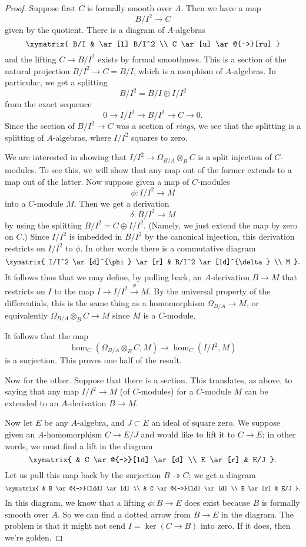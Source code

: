 \begin{proof} 
Suppose first $C$ is formally smooth over $A$.
Then we have a map
\[ B/I^2 \to C  \]
given by the quotient. 
There is a diagram of $A$-algebras
\[ \xymatrix{
B/I & \ar[l] B/I^2 \\
C \ar[u] \ar@{-->}[ru]
}\]
and the lifting $C \to B/I^2$ exists by formal smoothness. 
This is a section of the natural projection $B/I^2 \to C = B/I$, which is a
morphism of $A$-algebras.
In particular, we get a splitting 
\[ B/I^2 = B/I \oplus I/I^2  \]
from the exact sequence
\[ 0 \to I/I^2 \to B/I^2 \to C \to 0.  \]
Since the section of $B/I^2 \to C$ was a section of \emph{rings}, we see that
the splitting is a splitting of $A$-algebras, where $I/I^2$ squares to zero.

We are interested in showing that $I/I^2 \to \Omega_{B/A} \otimes_B C$ is a
split injection of $C$-modules. To see this, we will show that any map out of the former
extends to a map out of the latter.
Now suppose given a map
of $C$-modules
\[ \phi:  I/I^2 \to M \]
into a $C$-module $M$.
Then we get a derivation
\[ \delta:  B/I^2 \to M  \]
by using the splitting $B/I^2 = C \oplus I/I^2$.
(Namely, we just extend the map by zero on $C$.)
Since $I/I^2$ is imbedded in $B/I^2$ by the canonical injection, this
derivation restricts on $I/I^2$ to $\phi$. In other words there is a
commutative diagram
\[ \xymatrix{
I/I^2 \ar[d]^{\phi}  \ar[r] &  B/I^2 \ar[ld]^{\delta} \\
M
}.\]
It follows thus that we may define, by pulling back, an $A$-derivation $B \to
M$ that restricts on $I$ to the map $I \to I/I^2 \stackrel{\phi}{\to} M$. 
By the universal property of the differentials, this is the same thing as a
homomorphism $\Omega_{B/A} \to M$, or equivalently $\Omega_{B/A} \otimes_B C
\to M$ since $M$ is a $C$-module.

It follows that the map
\[ \hom_C(\Omega_{B/A} \otimes_B C, M) \to \hom_C(I/I^2, M)  \]
is a surjection. This proves one half of the result.

Now for the other.
Suppose that there is a section.
This translates, as above, to saying that
any map $I/I^2 \to M$  (of $C$-modules) for a $C$-module $M$
 can be extended to an $A$-derivation $B \to M$.

Now let $E$ be any $A$-algebra, and $J \subset E$
an ideal of square zero.
We suppose given an $A$-homomorphism $C \to E/J$
and would like to lift it to $C \to E$; in other words, we must 
find a lift in the diagram
\[ \xymatrix{
& C \ar@{-->}[ld] \ar[d]  \\
E \ar[r] & E/J
}.\]
Let us pull this map back by the surjection 
$B \twoheadrightarrow C$; we get a diagram
\[ \xymatrix{
& B \ar@{-->}[ldd] \ar[d] \\
& C \ar@{-->}[ld] \ar[d]  \\
E \ar[r] & E/J
}.\]
In this diagram, we know that a lifting $\phi: B \to E$ does exist because $B$ is
formally smooth over $A$.
So we can find a dotted arrow from $B \to E$ in the diagram.
The problem is that it might not send
$I = \ker(C \to B) $ into zero.
If it does, then we're golden.


\end{proof}
